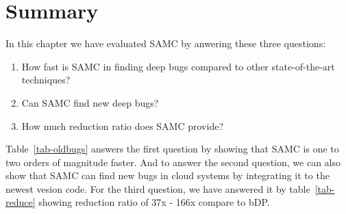 \section{Summary}
In this chapter we have evaluated SAMC by anwering these three questions:
\begin{enumerate}
\item How fast is SAMC in finding deep bugs compared to other state-of-the-art techniques?  
\item Can SAMC find new deep bugs?  
\item How much reduction ratio does SAMC provide?
\end{enumerate}
Table~\ref{tab-oldbugs} answers the first question by showing that SAMC is one
to two orders of magnitude faster. And to answer the second question, we can
also show that SAMC can find new bugs in cloud systems by integrating it to the
newest vesion code. For the third question, we have answered it by
table~\ref{tab-reduce} showing reduction ratio of 37x - 166x compare to bDP.
